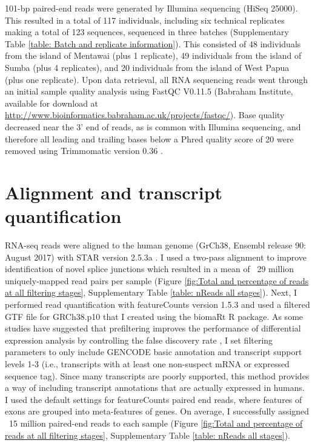 \documentclass[12pt,a4paper,titlepage,twoside,openright]{book}
\begin{document}
\begin{mainmatter}
{101-bp paired-end reads were generated by Illumina sequencing (HiSeq 25000). This resulted in a total of 117 individuals, including six technical replicates making a total of 123 sequences, sequenced in three batches (Supplementary Table \ref{table: Batch and replicate information}). This consisted of 48 individuals from the island of Mentawai (plus 1 replicate), 49 individuals from the island of Sumba (plus 4 replicates), and 20 individuals from the island of West Papua (plus one replicate). Upon data retrieval, all RNA sequencing reads went through an initial sample quality analysis using FastQC V0.11.5 (Babraham Institute, available for download at \url{http://www.bioinformatics.babraham.ac.uk/projects/fastqc/}). Base quality decreased near the 3’ end of reads, as is common with Illumina sequencing, and therefore all leading and trailing bases below a Phred quality score of 20 were removed using Trimmomatic version 0.36 \cite{bolger2014trimmomatic}.

\section{Alignment and transcript quantification}
RNA-seq reads were aligned to the human genome (GrCh38, Ensembl release 90: August 2017) with STAR version 2.5.3a \cite{dobin2013star}. I used a two-pass alignment to improve identification of novel splice junctions which resulted in a mean of ~29 million uniquely-mapped read pairs per sample (Figure \ref{fig:Total and percentage of reads at all filtering stages}, Supplementary Table \ref{table: nReads all stages}). Next, I performed read quantification with featureCounts version 1.5.3 \cite{liao2013featurecounts} and used a filtered GTF file for GRCh38.p10 that I created using the biomaRt R package. As some studies have suggested that prefiltering improves the performance of differential expression analysis by controlling the false discovery rate \cite{soneson2015differential}, I set filtering parameters to only include GENCODE basic annotation and transcript support levels 1-3 (i.e., transcripts with at least one non-suspect mRNA or expressed sequence tag). Since many transcripts are poorly supported, this method provides a way of including transcript annotations that are actually expressed in humans. I used the default settings for featureCounts paired end reads, where features of exons are grouped into meta-features of genes. On average, I successfully assigned ~15 million paired-end reads to each sample (Figure \ref{fig:Total and percentage of reads at all filtering stages}, Supplementary Table \ref{table: nReads all stages}). 

}
\end{mainmatter}
\end{document}
